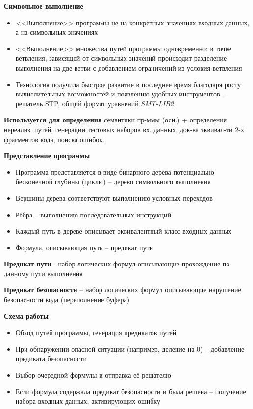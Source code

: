 
\textbf{Символьное выполнение}
\begin{itemize}
    \item <<Выполнение>> программы не на конкретных значениях входных данных, а на символьных значениях
    \item <<Выполнение>> множества путей программы одновременно: в точке ветвления, зависящей от символьных значений происходит разделение выполнения на две ветви с добавлением ограничений из условия ветвления
    \item Технология получила быстрое развитие в последнее время благодаря росту вычислительных возможностей и появлению удобных инструментов – решатель STP, общий формат уравнений \textit{SMT-LIB2}
\end{itemize}

\textbf{Используется для определения} семантики пр-ммы (осн.) + определения нереализ. путей, генерации тестовых наборов вх. данных, док-ва эквивал-ти 2-х фрагментов кода, поиска ошибок.

\textbf{Представление программы}
\begin{itemize}
    \item Программа представляется в виде бинарного дерева потенциально бесконечной глубины (циклы) – дерево символьного выполнения
    \item Вершины дерева соответствуют выполнению условных переходов
    \item Рёбра – выполнению последовательных инструкций
    \item Каждый путь в дереве описывает эквивалентный класс входных данных
    \item Формула, описывающая путь – предикат пути
\end{itemize}

\textbf{Предикат пути} - набор логических формул описывающие прохождение по данному пути выполнения

\textbf{Предикат безопасности} – набор логических формул описывающие нарушение
безопасности кода (переполнение буфера)

\textbf{Схема работы}
\begin{itemize}
    \item Обход путей программы, генерация предикатов путей
    \item При обнаружении опасной ситуации (например, деление на 0) – добавление предиката безопасности
    \item Выбор очередной формулы и отправка её решателю
    \item Если формула содержала предикат безопасности и была решена – получение набора входных данных, активирующих ошибку
\end{itemize}

